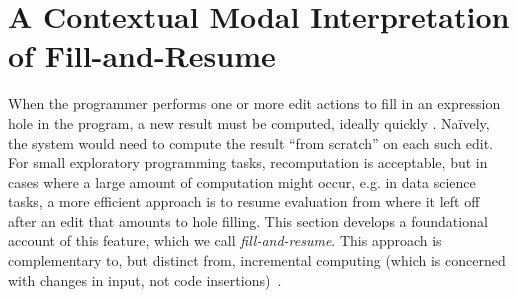 



\newcommand{\commutativitySec}{A Contextual Modal Interpretation of Fill-and-Resume}
\section{\commutativitySec}
\label{sec:resumption}


When the programmer performs one or more edit actions to fill in an expression hole in the program, a new result must be computed, ideally quickly \cite{DBLP:conf/icse/Tanimoto13,DBLP:journals/vlc/Tanimoto90}. Na\"ively, the system would need to compute the result ``from scratch'' on each such edit. For small exploratory programming tasks, recomputation is acceptable, but in cases where a large amount of computation might occur, e.g. in data science tasks, a more efficient approach is to resume evaluation from where it left off after an edit that amounts to hole filling. This section develops a foundational account of this feature, which we call \emph{fill-and-resume}. This approach is complementary to, but distinct from, incremental computing (which is concerned with changes in input, not code insertions)~\cite{Hammer2014}.

